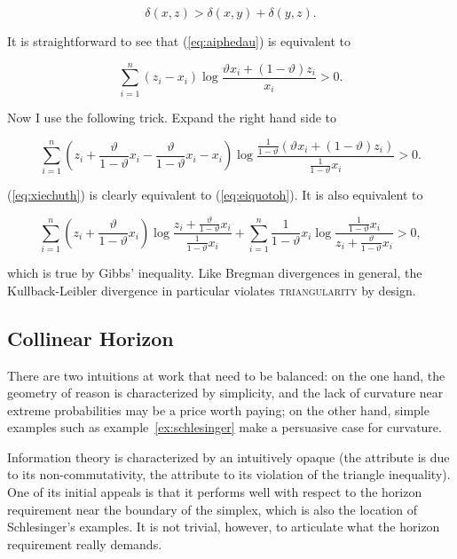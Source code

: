 \documentclass[12pt]{article}
\begin{document}
\begin{equation}
  \label{eq:aiphedau}
  \delta(x,z)>\delta\left(x,y\right)+\delta\left(y,z\right).
\end{equation}

It is straightforward to see that (\ref{eq:aiphedau}) is equivalent to

\begin{equation}
  \label{eq:eiquotoh}
  \sum_{i=1}^{n}(z_{i}-x_{i})\log\frac{\vartheta{}x_{i}+(1-\vartheta)z_{i}}{x_{i}}>0.
\end{equation}

Now I use the following trick. Expand the right hand side to

\begin{equation}
  \label{eq:xiechuth}
  \sum_{i=1}^{n}\left(z_{i}+\frac{\vartheta}{1-\vartheta}x_{i}-\frac{\vartheta}{1-\vartheta}x_{i}-x_{i}\right)\log\frac{\frac{1}{1-\vartheta}\left(\vartheta{}x_{i}+(1-\vartheta)z_{i}\right)}{\frac{1}{1-\vartheta}x_{i}}>0.
\end{equation}

(\ref{eq:xiechuth}) is clearly equivalent to (\ref{eq:eiquotoh}). It
is also equivalent to

\begin{equation}
  \label{eq:ohrohshi}
  \sum_{i=1}^{n}\left(z_{i}+\frac{\vartheta}{1-\vartheta}x_{i}\right)\log\frac{z_{i}+\frac{\vartheta}{1-\vartheta}x_{i}}{\frac{1}{1-\vartheta}x_{i}}+
  \sum_{i=1}^{n}\frac{1}{1-\vartheta}x_{i}\log\frac{\frac{1}{1-\vartheta}x_{i}}{z_{i}+\frac{\vartheta}{1-\vartheta}x_{i}}>0,
\end{equation}

which is true by Gibbs' inequality. Like Bregman divergences in
general, the Kullback-Leibler divergence in particular violates
\textsc{triangularity} by design.

\subsection{Collinear Horizon}
\label{subsec:colhor}

There are two intuitions at work that need to be balanced: on the one
hand, the geometry of reason is characterized by simplicity, and the
lack of curvature near extreme probabilities may be a price worth
paying; on the other hand, simple examples such as
example~\ref{ex:schlesinger} make a persuasive case for curvature.

Information theory is characterized by an intuitively opaque
 (the attribute  is due to its
non-commutativity, the attribute  to its violation of the
triangle inequality). One of its initial appeals is that it performs
well with respect to the horizon requirement near the boundary of the
simplex, which is also the location of Schlesinger's examples. It is
not trivial, however, to articulate what the horizon requirement
really demands.
\end{document}
